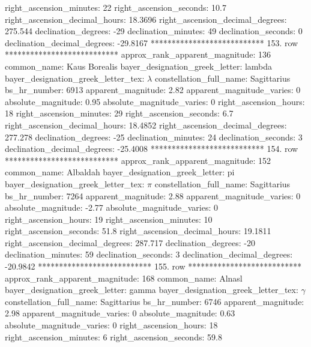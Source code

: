            right_ascension_minutes: 22
           right_ascension_seconds: 10.7
     right_ascension_decimal_hours: 18.3696
   right_ascension_decimal_degrees: 275.544
               declination_degrees: -29
               declination_minutes: 49
               declination_seconds: 0
       declination_decimal_degrees: -29.8167
*************************** 153. row ***************************
    approx_rank_apparent_magnitude: 136
                       common_name: Kaus Borealis
    bayer_designation_greek_letter: lambda
bayer_designation_greek_letter_tex: $\lambda$
           constellation_full_name: Sagittarius
                      bs_hr_number: 6913
                apparent_magnitude: 2.82
         apparent_magnitude_varies: 0
                absolute_magnitude: 0.95
         absolute_magnitude_varies: 0
             right_ascension_hours: 18
           right_ascension_minutes: 29
           right_ascension_seconds: 6.7
     right_ascension_decimal_hours: 18.4852
   right_ascension_decimal_degrees: 277.278
               declination_degrees: -25
               declination_minutes: 24
               declination_seconds: 3
       declination_decimal_degrees: -25.4008
*************************** 154. row ***************************
    approx_rank_apparent_magnitude: 152
                       common_name: Albaldah
    bayer_designation_greek_letter: pi
bayer_designation_greek_letter_tex: $\pi$
           constellation_full_name: Sagittarius
                      bs_hr_number: 7264
                apparent_magnitude: 2.88
         apparent_magnitude_varies: 0
                absolute_magnitude: -2.77
         absolute_magnitude_varies: 0
             right_ascension_hours: 19
           right_ascension_minutes: 10
           right_ascension_seconds: 51.8
     right_ascension_decimal_hours: 19.1811
   right_ascension_decimal_degrees: 287.717
               declination_degrees: -20
               declination_minutes: 59
               declination_seconds: 3
       declination_decimal_degrees: -20.9842
*************************** 155. row ***************************
    approx_rank_apparent_magnitude: 168
                       common_name: Alnasl
    bayer_designation_greek_letter: gamma
bayer_designation_greek_letter_tex: $\gamma$
           constellation_full_name: Sagittarius
                      bs_hr_number: 6746
                apparent_magnitude: 2.98
         apparent_magnitude_varies: 0
                absolute_magnitude: 0.63
         absolute_magnitude_varies: 0
             right_ascension_hours: 18
           right_ascension_minutes: 6
           right_ascension_seconds: 59.8
